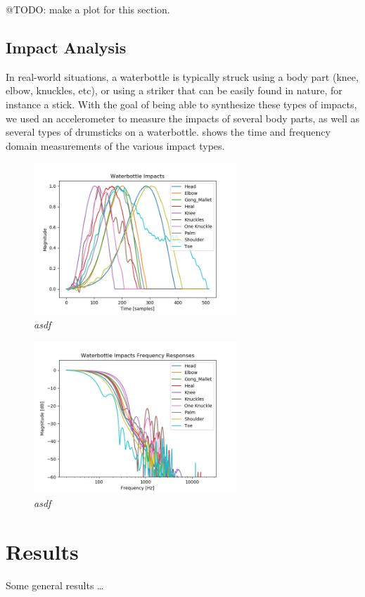 \documentclass[twoside,a4paper]{article}
\begin{document}
@TODO: make a plot for this section.
%
\subsection{Impact Analysis} \label{sec:impact}
%
In real-world situations, a waterbottle is typically struck using a body part
(knee, elbow, knuckles, etc), or using a striker that can be easily found in
nature, for instance a stick. With the goal of being able to synthesize these
types of impacts, we used an accelerometer to measure the impacts of
several body parts, as well as several types of drumsticks on a waterbottle.
 shows the time and frequency domain
measurements of the various impact types.
\begin{figure}
    \centering
    \includegraphics[width=3in]{../Figures/Impacts_time}
    \caption{\it{asdf}}
    \label{fig:impact-time}
\end{figure}
\begin{figure}
    \centering
    \includegraphics[width=3in]{../Figures/Impacts_freq}
    \caption{\it{asdf}}
    \label{fig:impact-freq}
\end{figure}


\section{Results} \label{sec:results}
%
Some general results \dots
%
\end{document}
